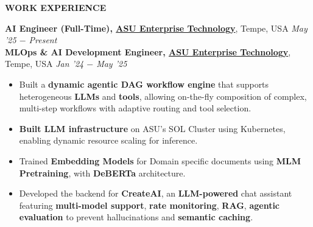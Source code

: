 \documentclass[10pt,a4]{article}
\def\hrulefill{\leavevmode\leaders\hrule height 1pt\hfill\kern0pt}		%
\begin{document}
{    %
		
\begin{flushleft}
    {\Large \textbf{WORK EXPERIENCE}} %

    \vspace{1.5mm}
    \hspace{1.5mm} \textbf{\large AI Engineer (Full-Time), \href{https://ai.asu.edu/ai-tools/ai-acceleration-team}{ASU Enterprise Technology}}, Tempe, USA \hfill \textit{\large May '25 $-$ Present} \\
    \hspace{1.5mm} \textbf{\large MLOps \& AI Development Engineer, \href{https://ai.asu.edu/ai-tools/ai-acceleration-team}{ASU Enterprise Technology}}, Tempe, USA \hfill \textit{\large Jan '24 $-$ May '25}
    \begin{itemize}
        \item Built a \textbf{dynamic agentic DAG workflow engine} that supports heterogeneous \textbf{LLMs} and \textbf{tools}, allowing on-the-fly composition of complex, multi-step workflows with adaptive routing and tool selection.
        \item \textbf{Built LLM infrastructure} on ASU’s SOL Cluster using Kubernetes, enabling dynamic resource scaling for inference.
        \item Trained \textbf{Embedding Models} for Domain specific documents using \textbf{MLM Pretraining}, with  \textbf{DeBERTa} architecture.
        \item Developed the backend for \textbf{CreateAI}, an \textbf{LLM-powered} chat assistant featuring \textbf{multi-model support}, \textbf{rate monitoring}, \textbf{RAG}, \textbf{agentic evaluation} to prevent hallucinations and \textbf{semantic caching}.


\end{itemize}
\end{flushleft}}
\end{document}
